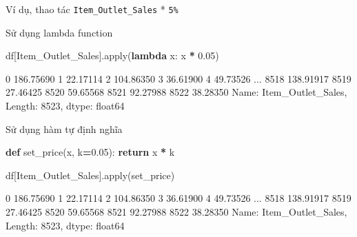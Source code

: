 \documentclass[
]{book}
\newenvironment{Shaded}{\begin{snugshade}}{\end{snugshade}}
\newcommand{\BuiltInTok}[1]{#1}
\newcommand{\ControlFlowTok}[1]{\textcolor[rgb]{0.13,0.29,0.53}{\textbf{#1}}}
\newcommand{\FloatTok}[1]{\textcolor[rgb]{0.00,0.00,0.81}{#1}}
\newcommand{\KeywordTok}[1]{\textcolor[rgb]{0.13,0.29,0.53}{\textbf{#1}}}
\newcommand{\NormalTok}[1]{#1}
\newcommand{\OperatorTok}[1]{\textcolor[rgb]{0.81,0.36,0.00}{\textbf{#1}}}
\newcommand{\StringTok}[1]{\textcolor[rgb]{0.31,0.60,0.02}{#1}}
\begin{document}
Ví dụ, thao tác \texttt{Item\_Outlet\_Sales} * \texttt{5\%}

Sử dụng lambda function

\begin{Shaded}
\begin{Highlighting}[]
\NormalTok{df[}\StringTok{\textquotesingle{}Item\_Outlet\_Sales\textquotesingle{}}\NormalTok{].}\BuiltInTok{apply}\NormalTok{(}\KeywordTok{lambda}\NormalTok{ x: x }\OperatorTok{*} \FloatTok{0.05}\NormalTok{)}
\end{Highlighting}
\end{Shaded}

\begin{Shaded}
\begin{Highlighting}[]
\NormalTok{0       186.75690}
\NormalTok{1        22.17114}
\NormalTok{2       104.86350}
\NormalTok{3        36.61900}
\NormalTok{4        49.73526}
\NormalTok{          ...    }
\NormalTok{8518    138.91917}
\NormalTok{8519     27.46425}
\NormalTok{8520     59.65568}
\NormalTok{8521     92.27988}
\NormalTok{8522     38.28350}
\NormalTok{Name: Item\_Outlet\_Sales, Length: 8523, dtype: float64}
\end{Highlighting}
\end{Shaded}

Sử dụng hàm tự định nghĩa

\begin{Shaded}
\begin{Highlighting}[]
\KeywordTok{def}\NormalTok{ set\_price(x, k}\OperatorTok{=}\FloatTok{0.05}\NormalTok{):}
    \ControlFlowTok{return}\NormalTok{ x }\OperatorTok{*}\NormalTok{ k}
\end{Highlighting}
\end{Shaded}

\begin{Shaded}
\begin{Highlighting}[]
\NormalTok{df[}\StringTok{\textquotesingle{}Item\_Outlet\_Sales\textquotesingle{}}\NormalTok{].}\BuiltInTok{apply}\NormalTok{(set\_price)}
\end{Highlighting}
\end{Shaded}

\begin{Shaded}
\begin{Highlighting}[]
\NormalTok{0       186.75690}
\NormalTok{1        22.17114}
\NormalTok{2       104.86350}
\NormalTok{3        36.61900}
\NormalTok{4        49.73526}
\NormalTok{          ...    }
\NormalTok{8518    138.91917}
\NormalTok{8519     27.46425}
\NormalTok{8520     59.65568}
\NormalTok{8521     92.27988}
\NormalTok{8522     38.28350}
\NormalTok{Name: Item\_Outlet\_Sales, Length: 8523, dtype: float64}
\end{Highlighting}
\end{Shaded}
\end{document}
